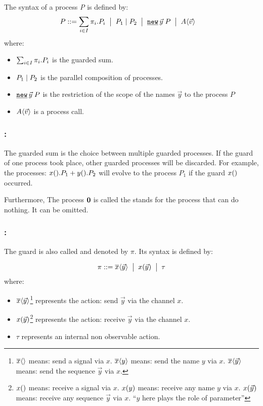 \begin{definition}
\label{def_process_syntax}
The syntax of a \picalc{} process \textit{P} is defined by: 
\begin{align*}
 P & \syntdef \procsum \ebnf \procpar{P_1}{P_2} \ebnf \procres{\vec{y}}{P} \ebnf \proccall{A}{\vec{v}}
\end{align*}
where:
\begin{itemize}
\item $\sum_{i\in I}{\pi_i.P_i}$ is the guarded sum.
\item $P_1 \mid P_2$ is the parallel composition of processes.
\item $\procres{\vec{y}}{P}$ is the restriction of the scope of the names $\vec{y}$ to the process $P$
\item $A\langle\vec{v}\rangle$ is a process call. 
\end{itemize}
\end{definition}

\subsubsection{:} The guarded sum is the choice between multiple guarded processes. If the guard of one process took place, other guarded processes will be discarded. For example, the processes: $x().P_1 + y().P_2$ will evolve to the process $P_1$ if the guard $x()$ occurred.

Furthermore, The process $\mathbf{0}$ is called the  stands for the process that can do nothing. It can be omitted.
\subsubsection{:} The guard is also called  and denoted by $\pi$. Its syntax is defined by:
\begin{definition}
\label{def_prefix_syntax}
\begin{align*}
 \pi ::= \overline{x}\langle\vec{y}\rangle \;\bigm|\; x(\vec{y}) \;\bigm|\; \tau
\end{align*}
where:
\begin{itemize}
\item $\overline{x}\langle\vec{y}\rangle$\footnote{$\overline{x}\langle{}\rangle$ means: send a signal via $x$. $\overline{x}\langle{y}\rangle$ means: send the name $y$ via $x$.  $\overline{x}\langle{\vec{y}}\rangle$ means: send the sequence $\vec{y}$ via $x$.} represents the action: send $\vec{y}$ via the channel $x$.
\item $x(\vec{y})$\footnote{$x({})$ means: receive a signal via $x$. $x({y})$ means: receive any name $y$ via $x$.  $x({\vec{y}})$ means: receive any sequence $\vec{y}$ via $x$. ``$y$ here plays the role of parameter''} represents the action: receive $\vec{y}$ via the channel $x$.
\item $\tau$ represents an internal non observable action.
\end{itemize}
\end{definition}

